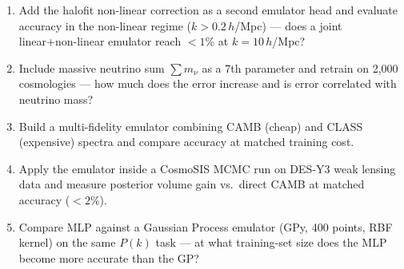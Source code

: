 \documentclass[11pt]{article}
\begin{document}
\begin{enumerate}[leftmargin=1.6em,itemsep=0.2em,topsep=0.2em,label=Q\arabic*.]
\item Add the halofit non-linear correction as a second emulator head and evaluate accuracy in the non-linear regime ($k > 0.2\,h$/Mpc) --- does a joint linear+non-linear emulator reach $<1\%$ at $k=10\,h$/Mpc?
\item Include massive neutrino sum $\sum m_\nu$ as a 7th parameter and retrain on 2,000 cosmologies --- how much does the error increase and is error correlated with neutrino mass?
\item Build a multi-fidelity emulator combining CAMB (cheap) and CLASS (expensive) spectra and compare accuracy at matched training cost.
\item Apply the emulator inside a CosmoSIS MCMC run on DES-Y3 weak lensing data and measure posterior volume gain vs.\ direct CAMB at matched accuracy ($<2\%$).
\item Compare MLP against a Gaussian Process emulator (GPy, 400 points, RBF kernel) on the same $P(k)$ task --- at what training-set size does the MLP become more accurate than the GP?
\end{enumerate}
\end{document}
